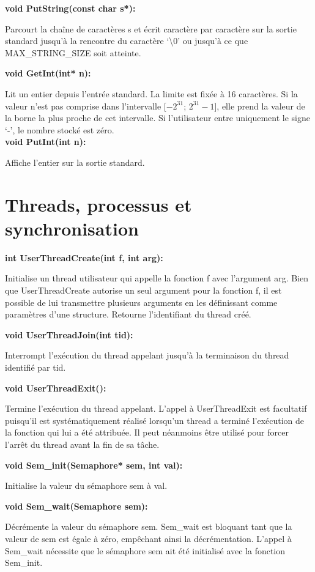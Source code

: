 \documentclass[12pt]{report}
\begin{document}
\bigskip
\textbf{void PutString(const char s*):}

Parcourt la chaîne de caractères s et écrit caractère par caractère sur la
sortie standard jusqu'à la rencontre du caractère `\textbackslash 0' ou jusqu'à
ce que MAX\_STRING\_SIZE soit atteinte.


\bigskip
\textbf{void GetInt(int* n):}

Lit un entier depuis l'entrée standard. La limite est fixée à 16 caractères. Si la valeur n'est pas comprise dans l'intervalle [$-2^{31}$;
$2^{31}-1$],  elle prend la valeur de la borne la plus proche de cet intervalle. Si l'utilisateur entre uniquement le signe `-', le nombre stocké est zéro.\\


\textbf{void PutInt(int n):}

Affiche l'entier sur la sortie standard.\\
\bigskip

\section{Threads, processus et synchronisation}
\bigskip

\textbf{int UserThreadCreate(int f, int arg):}

Initialise un thread utilisateur qui appelle la fonction f avec l'argument arg. Bien que UserThreadCreate autorise un seul argument pour la fonction f, il est possible de lui transmettre plusieurs arguments en les définissant comme paramètres d'une structure.
Retourne l’identifiant du thread créé.
\bigskip

\textbf{void UserThreadJoin(int tid):}

Interrompt l'exécution du thread appelant jusqu'à la terminaison du thread identifié par tid.
\bigskip


\textbf{void UserThreadExit():}

Termine l'exécution du thread appelant. L'appel à UserThreadExit est facultatif puisqu'il est systématiquement réalisé lorsqu'un thread a terminé l'exécution de la fonction qui lui a été attribuée. Il peut néanmoins être utilisé pour forcer l'arrêt du thread avant la fin de sa tâche.
\bigskip


\textbf{void Sem\_init(Semaphore* sem, int val):}

Initialise la valeur du sémaphore sem à val.
\bigskip	


\textbf{void Sem\_wait(Semaphore sem):}

Décrémente la valeur du sémaphore sem. Sem\_wait est bloquant tant que la valeur de sem est égale à zéro, empêchant ainsi la décrémentation.
L'appel à Sem\_wait nécessite que le sémaphore sem ait été initialisé avec la fonction Sem\_init.
\bigskip
\end{document}
